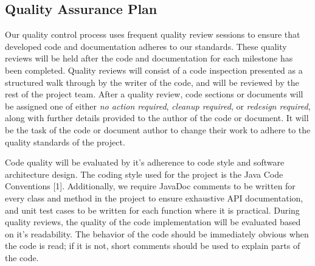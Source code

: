 \documentclass[12pt,a4paper]{article}
\begin{document}
	\subsection{Quality Assurance Plan}
Our quality control process uses frequent quality review sessions to ensure that developed code and documentation adheres to our standards. These quality reviews will be held after the code and documentation for each milestone has been completed. Quality reviews will consist of a code inspection presented as a structured walk through by the writer of the code, and will be reviewed by the rest of the project team. After a quality review, code sections or documents will be assigned one of either \textit{no action required}, \textit{cleanup required}, or \textit{redesign required}, along with further details provided to the author of the code or document. It will be the task of the code or document author to change their work to adhere to the quality standards of the project.

Code quality will be evaluated by it's adherence to code style and software architecture design. The coding style used for the project is the Java Code Conventions [1]. Additionally, we require JavaDoc comments to be written for every class and method in the project to ensure exhaustive API documentation, and unit test cases to be written for each function where it is practical. During quality reviews, the quality of the code implementation will be evaluated based on it's readability. The behavior of the code should be immediately obvious when the code is read; if it is not, short comments should be used to explain parts of the code.


	
    
\end{document}
